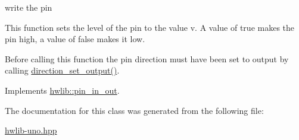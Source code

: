 write the pin 

This function sets the level of the pin to the value v. A value of true makes the pin high, a value of false makes it low.

Before calling this function the pin direction must have been set to output by calling \hyperlink{classuno_1_1pin__in__out_aaa337ac985b7181a8012a37bad7d4c60}{direction\+\_\+set\+\_\+output()}. 

Implements \hyperlink{classhwlib_1_1pin__in__out_a198c4d27a9783f4c17e8f5dfd9aca6a9}{hwlib\+::pin\+\_\+in\+\_\+out}.



The documentation for this class was generated from the following file\+:\begin{DoxyCompactItemize}
\item 
\hyperlink{hwlib-uno_8hpp}{hwlib-\/uno.\+hpp}\end{DoxyCompactItemize}
